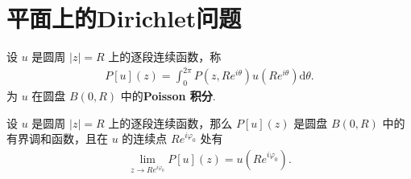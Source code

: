 \documentclass[../../main.tex]{subfiles}%
\begin{document}
\section{平面上的Dirichlet问题}

\begin{definition}
设 \(u\) 是圆周 \(|z|=R\) 上的逐段连续函数，称
\begin{align}
P[u](z) = \int_{0}^{2\pi} P(z, Re^{i\theta})u(Re^{i\theta}) \mathrm{d}\theta. \label{eq:poisson_def}
\end{align}
为 \(u\) 在圆盘 \(B(0,R)\) 中的\textbf{Poisson 积分}.
\end{definition}

\begin{theorem}\label{theorem:poisson_solution}
设 \(u\) 是圆周 \(|z|=R\) 上的逐段连续函数，那么 \(P[u](z)\) 是圆盘 \(B(0,R)\) 中的有界调和函数，且在 \(u\) 的连续点 \(Re^{i\varphi_0}\) 处有
\begin{align}
\lim\limits_{z\to Re^{i\varphi_0}} P[u](z) = u(Re^{i\varphi_0}). \label{eq:thm1_boundary}
\end{align}
\end{theorem}
\end{document}
